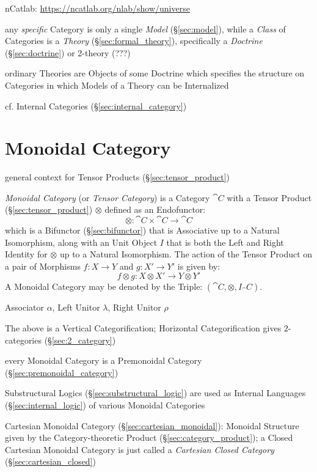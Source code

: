 nCatlab: \url{https://ncatlab.org/nlab/show/universe}

any \emph{specific} Category is only a single \emph{Model}
(\S\ref{sec:model}), while a \emph{Class} of Categories is a
\emph{Theory} (\S\ref{sec:formal_theory}), specifically a
\emph{Doctrine} (\S\ref{sec:doctrine}) or 2-theory (???)

ordinary Theories are Objects of some Doctrine which specifies the
structure on Categories in which Models of a Theory can be
Internalized

\fist cf. Internal Categories (\S\ref{sec:internal_category})



\section{Monoidal Category}\label{sec:monoidal_category}

general context for Tensor Products (\S\ref{sec:tensor_product})

\emph{Monoidal Category} (or \emph{Tensor Category}) is a Category
$\cat{C}$ with a Tensor Product (\S\ref{sec:tensor_product})
$\otimes$ defined as an Endofunctor:
\[
  \otimes : \cat{C} \times \cat{C} \rightarrow \cat{C}
\]
which is a Bifunctor (\S\ref{sec:bifunctor}) that is Associative up to
a Natural Isomorphism, along with an Unit Object $I$ that is both the
Left and Right Identity for $\otimes$ up to a Natural Isomorphism. The
action of the Tensor Product on a pair of Morphisms $f : X \rightarrow
Y$ and $g : X' \rightarrow Y'$ is given by:
\[
  f \otimes g : X \otimes X' \rightarrow Y \otimes Y'
\]
A Monoidal Category may be denoted by the Triple: $(\cat{C},
\otimes, I_\cat{C})$.

Associator $\alpha$, Left Unitor $\lambda$, Right Unitor $\rho$

The above is a Vertical Categorification; Horizontal Categorification
gives $2$-categories (\S\ref{sec:2_category})

every Monoidal Category is a Premonoidal Category
(\S\ref{sec:premonoidal_category})

\fist Substructural Logics (\S\ref{sec:substructural_logic}) are used
as Internal Languages (\S\ref{sec:internal_logic}) of various Monoidal
Categories

\fist Cartesian Monoidal Category (\S\ref{sec:cartesian_monoidal}): Monoidal
Structure given by the Category-theoretic Product
(\S\ref{sec:category_product}); a Closed Cartesian Monoidal Category is just
called a \emph{Cartesian Closed Category} (\S\ref{sec:cartesian_closed})

